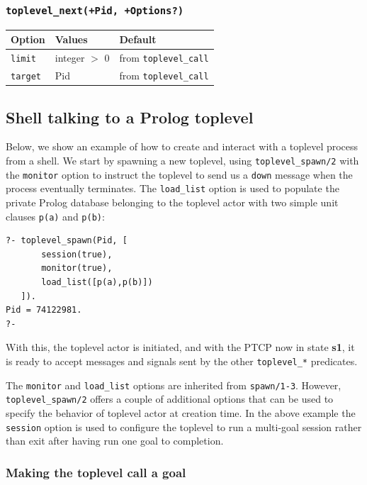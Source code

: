 \subsubsection*{\texttt{toplevel\_next(+Pid, +Options?)}}

\begin{tabularx}{11cm}{|X|X|X|}
\hline
\textbf{Option} & \textbf{Values} & \textbf{Default} \\
\hline
\texttt{limit} & integer $>$ 0 & from \texttt{toplevel\_call} \\
\texttt{target} & Pid & from \texttt{toplevel\_call} \\
\hline
\end{tabularx}

\subsection{Shell talking to a Prolog toplevel}

\noindent Below, we show an example of how to create and interact with a toplevel process from a shell. We start by spawning a new toplevel, using \texttt{toplevel\_spawn/2} with the \texttt{monitor} option to instruct the toplevel to send us a \texttt{down} message when the process eventually terminates. The \texttt{load\_list} option is used to populate the private Prolog database belonging to the toplevel actor with two simple unit clauses \texttt{p(a)} and \texttt{p(b)}:

\begin{verbatim}
?- toplevel_spawn(Pid, [
       session(true),
       monitor(true),
       load_list([p(a),p(b)])
   ]).
Pid = 74122981.
?-
\end{verbatim}

\noindent With this, the toplevel actor is initiated, and with the PTCP now in  state \textbf{s1}, it is ready to accept messages and signals sent by the other \texttt{toplevel\_*} predicates.

The \texttt{monitor} and \texttt{load\_list} options are inherited from \texttt{spawn/1-3}. However, \texttt{toplevel\_spawn/2} offers a couple of additional options that can be used to specify the behavior of toplevel actor at creation time. In the above example the \texttt{session} option is used to configure the toplevel to run a multi-goal session rather than exit after having run one goal to completion. 


\subsubsection{Making the toplevel call a goal}\label{sec:toplevel-call-goal}

